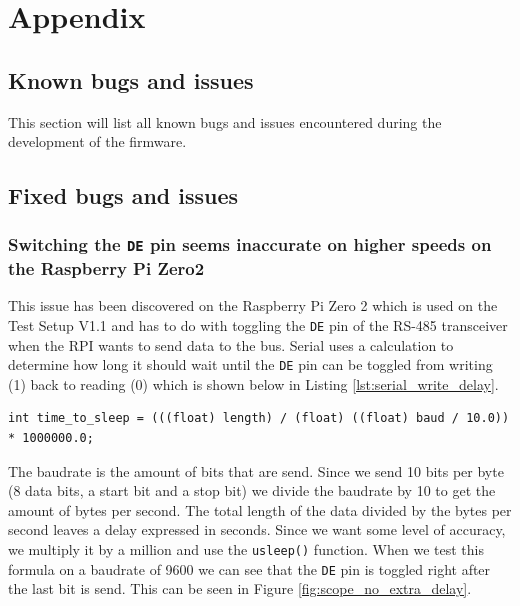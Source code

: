 \chapter{Appendix}

\section{Known bugs and issues}

This section will list all known bugs and issues encountered during the development of the firmware.


\section{Fixed bugs and issues}

\subsection{Switching the \texttt{DE} pin seems inaccurate on higher speeds on the Raspberry Pi Zero2}
\label{subsec:de-bug}

This issue has been discovered on the Raspberry Pi Zero 2 which is used on the Test Setup V1.1 and has to do with toggling the \texttt{DE} pin of the RS-485 transceiver when the RPI wants to send data to the bus.
Serial uses a calculation to determine how long it should wait until the \texttt{DE} pin can be toggled from writing (1) back to reading (0) which is shown below in Listing \ref{lst:serial_write_delay}.

\begin{lstlisting}[frame=single, caption={Dynamic calculated sleep depending on length of data and baudrate}, captionpos=b, label={lst:serial_write_delay}, basicstyle=\small, style=CStyle]
     int time_to_sleep = (((float) length) / (float) ((float) baud / 10.0)) * 1000000.0;
\end{lstlisting}

The baudrate is the amount of bits that are send. Since we send 10 bits per byte (8 data bits, a start bit and a stop bit) we divide the baudrate by 10 to get the amount of bytes per second.
The total length of the data divided by the bytes per second leaves a delay expressed in seconds. Since we want some level of accuracy, we multiply it by a million and use the \texttt{usleep()} function.
When we test this formula on a baudrate of 9600 we can see that the \texttt{DE} pin is toggled right after the last bit is send. This can be seen in Figure \ref{fig:scope_no_extra_delay}.


